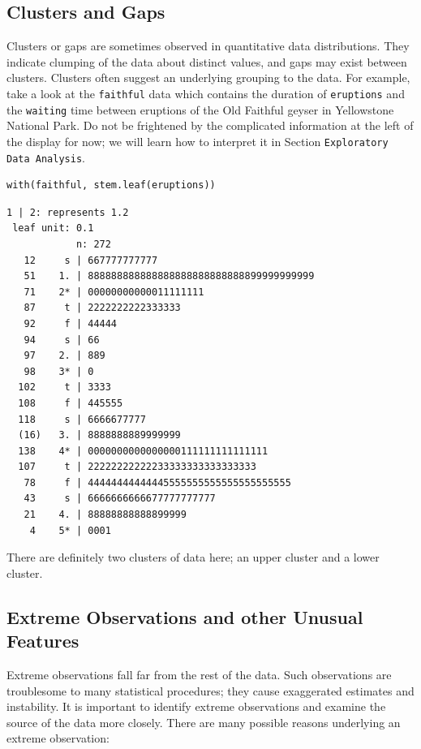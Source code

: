 \documentclass[10pt,english]{scrbook}
\begin{document}
\subsection[Clusters and Gaps]{Clusters and Gaps}
\label{sec-1-2-4}

Clusters or gaps are sometimes observed in quantitative data distributions. They indicate clumping of the data about distinct values, and gaps may exist between clusters. Clusters often suggest an underlying grouping to the data. For example, take a look at the \texttt{faithful} data which contains the duration of \texttt{eruptions} and the \texttt{waiting} time between eruptions of the Old Faithful geyser in Yellowstone National Park. Do not be frightened by the complicated information at the left of the display for now; we will learn how to interpret it in Section \texttt{Exploratory Data Analysis}.

\begin{verbatim}
with(faithful, stem.leaf(eruptions))
\end{verbatim}

\begin{verbatim}
1 | 2: represents 1.2
 leaf unit: 0.1
            n: 272
   12     s | 667777777777
   51    1. | 888888888888888888888888888899999999999
   71    2* | 00000000000011111111
   87     t | 2222222222333333
   92     f | 44444
   94     s | 66
   97    2. | 889
   98    3* | 0
  102     t | 3333
  108     f | 445555
  118     s | 6666677777
  (16)   3. | 8888888889999999
  138    4* | 0000000000000000111111111111111
  107     t | 22222222222233333333333333333
   78     f | 44444444444445555555555555555555555
   43     s | 6666666666677777777777
   21    4. | 88888888888899999
    4    5* | 0001
\end{verbatim}

There are definitely two clusters of data here; an upper cluster and a lower cluster. 
\subsection[Extreme Observations and other Unusual Features]{Extreme Observations and other Unusual Features}
\label{sec-1-2-5}

Extreme observations fall far from the rest of the data. Such observations are troublesome to many statistical procedures; they cause exaggerated estimates and instability. It is important to identify extreme observations and examine the source of the data more closely. There are many possible reasons underlying an extreme observation:
\end{document}

